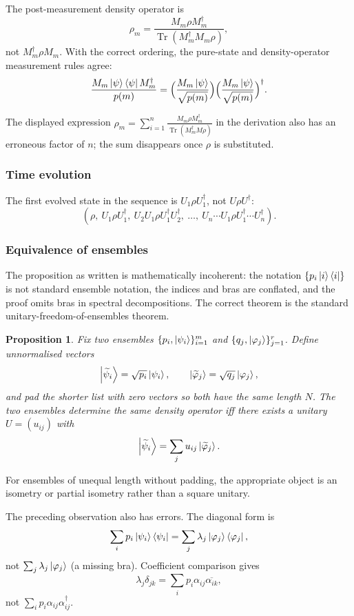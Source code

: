 \documentclass[12pt]{article}
\theoremstyle{plain}
\newtheorem{proposition}[thm]{Proposition}
\theoremstyle{definition}
\begin{document}
The post-measurement density operator is
\[
\rho_m=\frac{M_m\rho M_m^\dagger}{\operatorname{Tr}(M_m^\dagger M_m\rho)},
\]
not $M_m^\dagger\rho M_m$. With the correct ordering, the pure-state and density-operator measurement rules agree:
\[
\frac{M_m\ket{\psi}\bra{\psi}M_m^\dagger}{p(m)}=\Big(\frac{M_m\ket{\psi}}{\sqrt{p(m)}}\Big)\Big(\frac{M_m\ket{\psi}}{\sqrt{p(m)}}\Big)^\dagger.
\]

The displayed expression $\rho_m=\sum_{i=1}^n \frac{M_m\rho M_m^\dagger}{\operatorname{Tr}(M_m^\dagger M\rho)}$ in the derivation also has an erroneous factor of $n$; the sum disappears once $\rho$ is substituted.

\subsubsection*{Time evolution}

The first evolved state in the sequence is $U_1\rho U_1^\dagger$, not $U\rho U^\dagger$:
\[
(\rho,\ U_1\rho U_1^\dagger,\ U_2 U_1\rho U_1^\dagger U_2^\dagger,\ \ldots,\ U_n\cdots U_1\rho U_1^\dagger\cdots U_n^\dagger).
\]

\subsubsection*{Equivalence of ensembles}

The proposition as written is mathematically incoherent: the notation $\{p_i\ket{i}\bra{i}\}$ is not standard ensemble notation, the indices and bras are conflated, and the proof omits bras in spectral decompositions. The correct theorem is the standard unitary-freedom-of-ensembles theorem.

\begin{proposition}
Fix two ensembles $\{p_i,\ket{\psi_i}\}_{i=1}^m$ and $\{q_j,\ket{\varphi_j}\}_{j=1}^r$. Define unnormalised vectors
\[
\ket{\widetilde{\psi}_i}=\sqrt{p_i}\ket{\psi_i},\qquad \ket{\widetilde{\varphi}_j}=\sqrt{q_j}\ket{\varphi_j},
\]
and pad the shorter list with zero vectors so both have the same length $N$. The two ensembles determine the same density operator iff there exists a unitary $U=(u_{ij})$ with
\[
\ket{\widetilde{\psi}_i}=\sum_j u_{ij}\ket{\widetilde{\varphi}_j}.
\]
\end{proposition}

For ensembles of unequal length without padding, the appropriate object is an isometry or partial isometry rather than a square unitary.

The preceding observation also has errors. The diagonal form is
\[
\sum_i p_i\ket{\psi_i}\bra{\psi_i}=\sum_j\lambda_j\ket{\varphi_j}\bra{\varphi_j},
\]
not $\sum_j\lambda_j\ket{\varphi_j}$ (a missing bra). Coefficient comparison gives
\[
\lambda_j\delta_{jk}=\sum_i p_i\alpha_{ij}\overline{\alpha_{ik}},
\]
not $\sum_i p_i\alpha_{ij}\alpha_{ij}^\dagger$.
\end{document}
